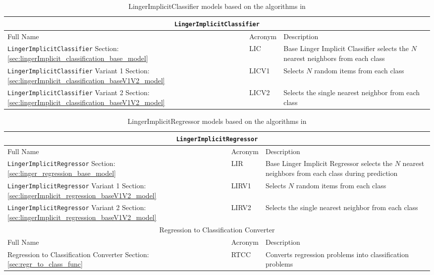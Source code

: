\documentclass[a4paper, 12pt]{report}
\begin{document}
\begin{table}[H]
    \centering
    \begin{tabular}{ |p{6cm}|p{2cm}|p{9cm}| }
        \hline
        \multicolumn{3}{|c|}{\texttt{LingerImplicitClassifier}} \\
        \hline
        Full Name & Acronym & Description \\
        \hline
        \texttt{LingerImplicitClassifier} Section: \ref{sec:lingerImplicit_classification_base_model} & LIC & Base Linger Implicit Classifier selects the $N$ nearest neighbors from each class \\
        \hline
        \texttt{LingerImplicitClassifier} Variant 1 Section: \ref{sec:lingerImplicit_classification_baseV1V2_model} & LICV1 & Selects $N$ random items from each class \\
        \hline
        \texttt{LingerImplicitClassifier} Variant 2 Section: \ref{sec:lingerImplicit_classification_baseV1V2_model} & LICV2 & Selects the single nearest neighbor from each class \\
        \hline
    \end{tabular}
    \caption{LingerImplicitClassifier models based on the algorithms in \cite{ye2021learning}}
    \label{tab:LingerImplicitClassifier_models}
\end{table}

\begin{table}[H]
    \centering
    \begin{tabular}{ |p{6cm}|p{2cm}|p{9cm}| }
        \hline
        \multicolumn{3}{|c|}{\texttt{LingerImplicitRegressor}} \\
        \hline
        Full Name & Acronym & Description \\
        \hline
        \texttt{LingerImplicitRegressor} Section: \ref{sec:linger_regression_base_model} & LIR & Base Linger Implicit Regressor selects the $N$ nearest neighbors from each class during prediction \\
        \hline
        \texttt{LingerImplicitRegressor} Variant 1 Section: \ref{sec:lingerImplicit_regression_baseV1V2_model} & LIRV1 & Selects $N$ random items from each class \\
        \hline
        \texttt{LingerImplicitRegressor} Variant 2 Section: \ref{sec:lingerImplicit_regression_baseV1V2_model} & LIRV2 & Selects the single nearest neighbor from each class \\
        \hline
        \multicolumn{3}{|c|}{Regression to Classification Converter} \\
        \hline
        Full Name & Acronym & Description \\
        \hline
        Regression to Classification Converter Section: \ref{sec:regr_to_class_func} & RTCC & Converts regression problems into classification problems \\
        \hline
    \end{tabular}
    \caption{LingerImplicitRegressor models based on the algorithms in \cite{ye2021learning}}
    \label{tab:ingerImplicitRegressor_models}
\end{table}
\end{document}
